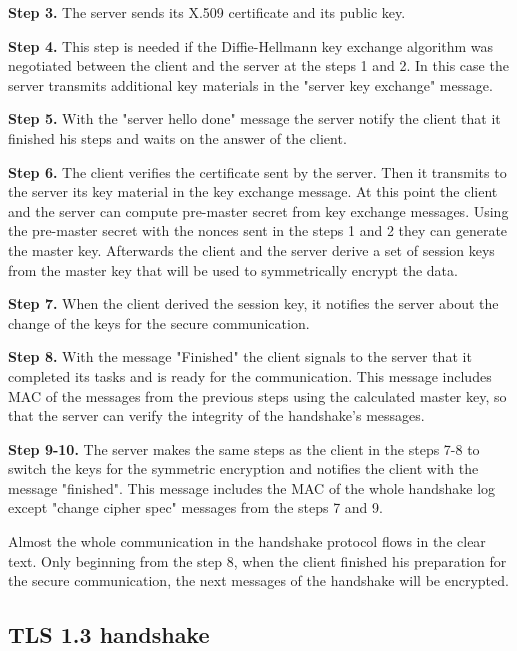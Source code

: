 \textbf{Step 3.} The server sends its X.509 certificate and its public key.

\textbf{Step 4.} This step is needed if the Diffie-Hellmann key exchange algorithm was negotiated between the client and the server at the steps 1 and 2. In this case the server transmits additional key materials in the "server key exchange" message.

\textbf{Step 5.} With the "server hello done" message the server notify the client that it finished his steps and waits on the answer of the client.

\textbf{Step 6.} The client verifies the certificate sent by the server. Then it transmits to the server its key material in the key exchange message. 
At this point the client and the server can compute pre-master secret from key exchange messages. Using the pre-master secret with the nonces sent in the steps 1 and 2 they can generate the master key. Afterwards the client and the server derive a set of session keys from the master key that will be used to symmetrically encrypt the data.

\textbf{Step 7.} When the client derived the session key, it notifies the server about the change of the keys for the secure communication.

\textbf{Step 8.} With the message "Finished" the client signals to the server that it completed its tasks and is ready for the communication. This message includes MAC of the messages from the previous steps using the calculated master key, so that the server can verify the integrity of the handshake's messages.

\textbf{Step 9-10.} The server makes the same steps as the client in the steps 7-8 to switch the keys for the symmetric encryption and notifies the client with the message "finished". This message includes the MAC of the whole handshake log except "change cipher spec" messages from the steps 7 and 9. \cite{sslstore:handshake}\cite{Hassenstein}

Almost the whole communication in the handshake protocol flows in the clear text. Only beginning from the step 8, when the client finished his preparation for the secure communication, the next messages of the handshake will be encrypted.

\subsection{TLS 1.3 handshake}
\label{subsec:handshake1_3}

